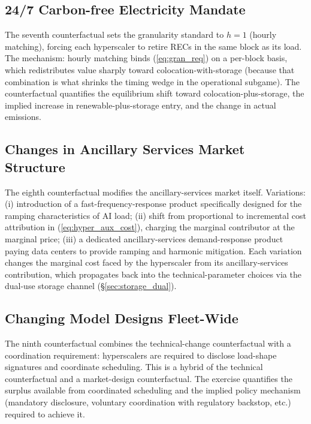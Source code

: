 \documentclass[12pt,letterpaper]{article}
\begin{document}
\subsection{24/7 Carbon-free Electricity Mandate}

The seventh counterfactual sets the granularity standard to $h = 1$
(hourly matching), forcing each hyperscaler to retire RECs in the same
block as its load. The mechanism: hourly matching binds (\ref{eq:gran_req})
on a per-block basis, which redistributes value sharply toward
colocation-with-storage (because that combination is what shrinks the
timing wedge in the operational subgame). The counterfactual quantifies
the equilibrium shift toward colocation-plus-storage, the implied increase
in renewable-plus-storage entry, and the change in actual emissions.

\subsection{Changes in Ancillary Services Market Structure}

The eighth counterfactual modifies the ancillary-services market itself.
Variations: (i) introduction of a fast-frequency-response product
specifically designed for the ramping characteristics of AI load;
(ii) shift from proportional to incremental cost attribution in
(\ref{eq:hyper_aux_cost}), charging the marginal contributor at the
marginal price; (iii) a dedicated ancillary-services demand-response
product paying data centers to provide ramping and harmonic mitigation.
Each variation changes the marginal cost faced by the hyperscaler from
its ancillary-services contribution, which propagates back into the
technical-parameter choices via the dual-use storage channel
(\S\ref{sec:storage_dual}).

\subsection{Changing Model Designs Fleet-Wide}

The ninth counterfactual combines the technical-change counterfactual
with a coordination requirement: hyperscalers are required to disclose
load-shape signatures and coordinate scheduling. This is a hybrid of
the technical counterfactual and a market-design counterfactual.
The exercise quantifies the surplus available from coordinated scheduling
and the implied policy mechanism (mandatory disclosure, voluntary
coordination with regulatory backstop, etc.) required to achieve it.
\end{document}
